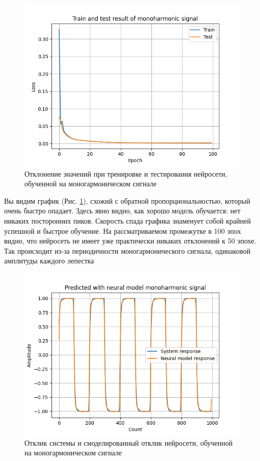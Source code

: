 \begin{figure}[H]
	\centering
	\includegraphics[width=1\linewidth]{body/images/Train-and-test-result-of-monoharmonic-signal.png}
	\caption{Отклонение значений при тренировке и тестирования нейросети, обученной на моногармоническом сигнале}
	\label{fig:17}
\end{figure}

Вы видим график (Рис. \ref{fig:17}), схожий с обратной пропорциональностью, который очень быстро опадает. Здесь явно видно, как хорошо
модель обучается: нет никаких посторонних пиков. Скорость спада графика знаменует собой крайней успешной и быстрое обучение.
На рассматриваемом промежутке в 100 эпох видно, что нейросеть не имеет уже практически никаких отклонений к 50 эпохе.
Так происходит из-за периодичности моногармонического сигнала, одинаковой амплитуды каждого лепестка

\begin{figure}[H]
	\centering
	\includegraphics[width=1\linewidth]{body/images/Predicted-with-neural-model-monoharmonic-signal.png}
	\caption{Отклик системы и смоделированный отклик нейросети, обученной на моногармоническом сигнале}
	\label{fig:18}
\end{figure}

